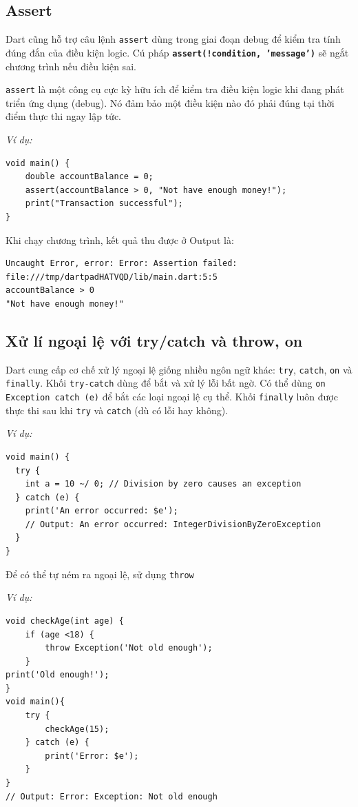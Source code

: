 \documentclass[../DoAn.tex]{subfiles}
\numberwithin{figure}{chapter}
\begin{document}
\subsection{Assert} 
Dart cũng hỗ trợ câu lệnh \texttt{assert} dùng trong giai đoạn debug để kiểm tra tính đúng đắn của điều kiện logic. Cú pháp  \textbf{\texttt{assert(!condition, 'message')}} sẽ ngắt chương trình nếu điều kiện sai. 

\texttt{assert} là một công cụ cực kỳ hữu ích để kiểm tra điều kiện
logic khi đang phát triển ứng dụng (debug). Nó đảm bảo một điều kiện nào đó phải đúng tại thời điểm thực thi ngay lập tức. 

\textit{Ví dụ:}
\begin{lstlisting}
void main() {
    double accountBalance = 0;
    assert(accountBalance > 0, "Not have enough money!");
    print("Transaction successful");
}
\end{lstlisting}

Khi chạy chương trình, kết quả thu được ở Output là:
\begin{lstlisting}
Uncaught Error, error: Error: Assertion failed: 
file:///tmp/dartpadHATVQD/lib/main.dart:5:5
accountBalance > 0
"Not have enough money!"  
\end{lstlisting}  

\subsection{Xử lí ngoại lệ với try/catch và throw, on}

Dart cung cấp cơ chế xử lý ngoại lệ giống nhiều ngôn ngữ khác: \texttt{try}, \texttt{catch}, \texttt{on} và \texttt{finally}. Khối \texttt{try-catch} dùng để bắt và xử lý lỗi bất ngờ. Có thể dùng \texttt{on Exception catch (e)} để bắt các loại ngoại lệ cụ thể. Khối \texttt{finally} luôn được thực thi sau khi \texttt{try} và \texttt{catch} (dù có lỗi hay không). 

\textit{Ví dụ:}
\begin{lstlisting}
void main() {
  try {
    int a = 10 ~/ 0; // Division by zero causes an exception
  } catch (e) {
    print('An error occurred: $e');
    // Output: An error occurred: IntegerDivisionByZeroException
  }
}
\end{lstlisting}

Để có thể tự ném ra ngoại lệ, sử dụng \texttt{throw} 

\textit{Ví dụ:}
\begin{lstlisting}
void checkAge(int age) {
    if (age <18) {
        throw Exception('Not old enough');
    }
print('Old enough!');
}
void main(){
    try {
        checkAge(15);
    } catch (e) {
        print('Error: $e');
    }
}
// Output: Error: Exception: Not old enough
\end{lstlisting}
\end{document}
